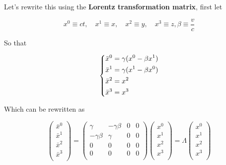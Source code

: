 \documentclass[a4paper]{article}
\begin{document}
Let's rewrite this using the \textbf{Lorentz transformation matrix}, first let

\begin{equation*}
    x^0\equiv ct,\quad x^1\equiv x,\quad x^2\equiv y,\quad x^3\equiv z, \beta\equiv\frac{v}{c}
\end{equation*}

So that

\begin{equation*}
    \begin{dcases}
        \bar{x}^0 = \gamma(x^0-\beta x^1) \\
        \bar{x}^1 = \gamma(x^1-\beta x^0) \\
        \bar{x}^2 = x^2 \\
        \bar{x}^3 = x^3 \\
    \end{dcases}
\end{equation*}

Which can be rewritten as

\begin{equation*}
    \begin{pmatrix}
        \bar{x}^0 \\
        \bar{x}^1 \\
        \bar{x}^2 \\
        \bar{x}^3 \\
    \end{pmatrix}
    =
    \begin{pmatrix}
        \gamma & -\gamma\beta & 0 & 0 \\
        -\gamma\beta & \gamma & 0 & 0 \\
        0 & 0 & 0 & 0 \\
        0 & 0 & 0 & 0 \\
    \end{pmatrix}
    \begin{pmatrix}
        x^0 \\
        x^1 \\
        x^2 \\
        x^3 \\
    \end{pmatrix}
    =
    \Lambda    
    \begin{pmatrix}
        x^0 \\
        x^1 \\
        x^2 \\
        x^3 \\
    \end{pmatrix}
\end{equation*}
\end{document}
